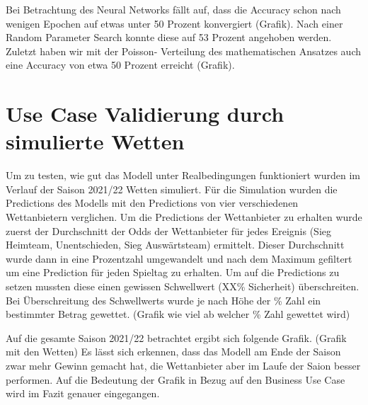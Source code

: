 Bei Betrachtung des Neural Networks fällt auf, dass die Accuracy
schon nach wenigen Epochen auf etwas unter 50 Prozent konvergiert
(Grafik). Nach einer Random Parameter Search konnte diese auf 53
Prozent angehoben werden. Zuletzt haben wir mit der Poisson-
Verteilung des mathematischen Ansatzes auch eine Accuracy von
etwa 50 Prozent erreicht (Grafik).

\section{Use Case Validierung durch simulierte Wetten}

Um zu testen, wie gut das Modell unter Realbedingungen funktioniert
wurden im Verlauf der Saison 2021/22 Wetten simuliert. Für die
Simulation wurden die Predictions des Modells mit den Predictions von
vier verschiedenen Wettanbietern verglichen. Um die Predictions der
Wettanbieter zu erhalten wurde zuerst der Durchschnitt der Odds der
Wettanbieter für jedes Ereignis (Sieg Heimteam, Unentschieden, Sieg Auswärtsteam)
ermittelt. Dieser Durchschnitt wurde dann in eine Prozentzahl umgewandelt
und nach dem Maximum gefiltert um eine Prediction für jeden Spieltag zu erhalten.
Um auf die Predictions zu setzen mussten diese einen gewissen Schwellwert (XX\% Sicherheit) überschreiten.
Bei Überschreitung des Schwellwerts wurde je nach Höhe der \% Zahl ein bestimmter Betrag gewettet.
(Grafik wie viel ab welcher \% Zahl gewettet wird)

Auf die gesamte Saison 2021/22 betrachtet ergibt sich folgende Grafik.
(Grafik mit den Wetten)
Es lässt sich erkennen, dass das Modell am Ende der Saison zwar mehr Gewinn gemacht
hat, die Wettanbieter aber im Laufe der Saion besser performen. Auf die Bedeutung der Grafik
in Bezug auf den Business Use Case wird im Fazit genauer eingegangen.
